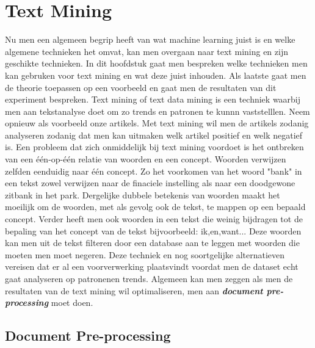 \chapter{Text Mining}\label{Text Mining}

Nu men een algemeen begrip heeft van wat machine learning juist is en welke algemene technieken het omvat, kan men overgaan naar text mining en zijn geschikte technieken. In dit hoofdstuk gaat men bespreken welke technieken men kan gebruken voor text mining en wat deze juist inhouden. Als laatste gaat men de theorie toepassen op een voorbeeld en gaat men de resultaten van dit experiment bespreken. 
\newline
%
Text mining of text data mining is een techniek waarbij men aan tekstanalyse doet om zo trends en patronen te kunnn vaststelllen. Neem opnieuw als voorbeeld onze artikels. Met text mining wil men de artikels zodanig analyseren zodanig dat men kan uitmaken welk artikel positief en welk negatief is.
Een probleem dat zich onmiddelijk bij text mining voordoet is het ontbreken van een  \'e\'en-op-\'e\'en relatie van woorden en een concept. Woorden verwijzen zelfden eenduidig naar \'e\'en concept. Zo het voorkomen van het woord "bank" in een tekst zowel verwijzen naar de finaciele instelling als naar een doodgewone zitbank in het park. Dergelijke dubbele betekenis van woorden maakt het moeilijk om de woorden, met als gevolg ook de tekst, te mappen op een bepaald concept.
% 
Verder heeft men ook woorden in een tekst die weinig bijdragen tot de bepaling van het concept van de tekst bijvoorbeeld: ik,en,want...
Deze woorden kan men uit de tekst filteren door een database aan te leggen met woorden die moeten men moet negeren. Deze techniek en nog soortgelijke alternatieven vereisen dat er al een voorverwerking plaatsvindt voordat men de dataset echt gaat analyseren op patronenen trends. Algemeen kan men zeggen als men de resultaten van de text mining wil optimaliseren, men aan \textbf{\textit{document pre-processing}} moet doen.

\section{Document Pre-processing }\label{Document Pre-processing}

